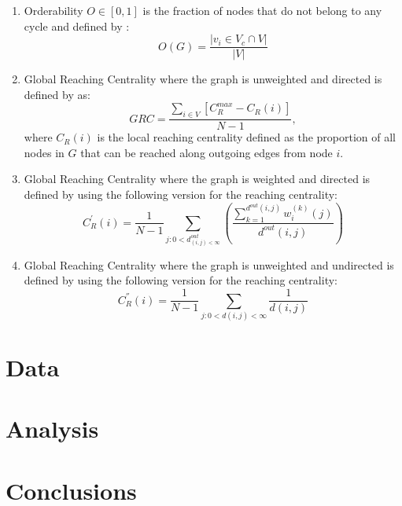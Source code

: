 \documentclass[3p,times]{elsarticle}
\begin{document}
\begin{enumerate}
	\item Orderability $O\in[0,1]$ is the fraction of nodes that do not belong to any cycle and defined by \cite{3D}:
	$$
	O(G)=\frac{|v_i\in V_c\cap V|}{|V|}
	$$
	
	\item Global Reaching Centrality where the graph is unweighted and directed is defined by \cite{GRC} as:
	$$
	GRC=\frac{\sum_{i\in V}{[C_R^{max}-C_R(i)]}}{N-1},
	$$
	where $C_R(i)$ is the local reaching centrality defined as the proportion of all nodes in $G$ that can be reached along outgoing edges from node $i$.
	
	\item Global Reaching Centrality where the graph is weighted and directed is defined by \cite{GRC} using the following version for the reaching centrality:
	$$
	C_{R}^{'}(i)=\frac{1}{N-1}\sum_{j: 0<d^{out}_{(i,j)<\infty}}{( \frac{\sum_{k=1}^{d^{out}(i,j)} {w_{i}^{(k)} (j) } }{d^{out}(i,j)} )}
	$$
	
	\item Global Reaching Centrality where the graph is unweighted and undirected is defined by \cite{GRC} using the following version for the reaching centrality:
	$$
	C_{R}^{''}(i)=\frac{1}{N-1}\sum_{j:0<d(i,j)<\infty}{\frac{1}{d(i,j)}}
	$$
\end{enumerate}

\section{Data}



\section{Analysis}


 
\section{Conclusions}






\end{document}
